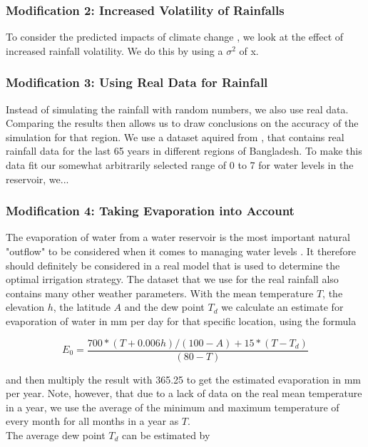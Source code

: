 \documentclass[12pt, a4paper, oneside]{article}
\begin{document}
\subsubsection{Modification 2: Increased Volatility of Rainfalls}
To consider the predicted impacts of climate change \citep{guhathakurta2011impact}, we look at the effect of increased rainfall volatility. 
We do this by using a  $\sigma^2$ of x. %

\subsubsection{Modification 3: Using Real Data for Rainfall}
Instead of simulating the rainfall with random numbers, we also use real data.
Comparing the results then allows us to draw conclusions on the accuracy of the simulation for that region. 
We use a dataset aquired from \citep{kaggle:2019}, that contains real rainfall data for the last 65 years in different regions of Bangladesh. %
To make this data fit our somewhat arbitrarily selected range of 0 to 7 for water levels in the reservoir, we...

\subsubsection{Modification 4: Taking Evaporation into Account} \label{sec:intro-mod4}
The evaporation of water from a water reservoir is the most important natural "outflow" to be considered when it comes to managing water levels \citep{tanny2008evaporation}.
It therefore should definitely be considered in a real model that is used to determine the optimal irrigation strategy.
The dataset that we use for the real rainfall also contains many other weather parameters.
With the mean temperature $T$, the elevation $h$, the latitude $A$ and the dew point $T_d$ we calculate an estimate for evaporation of water in mm per day for that specific location, using the formula \citep{linacre1977simple}

\begin{equation}
	{E_0} = \frac{700 * (T + 0.006h) / (100 - A) + 15 * (T - T_d)}{(80 - T)}
\end{equation}

and then multiply the result with 365.25 to get the estimated evaporation in mm per year. 
Note, however, that due to a lack of data on the real mean temperature in a year, we use the average of the minimum and maximum temperature of every month for all months in a year as $T$. \\
The average dew point $T_d$ can be estimated by 
\end{document}
